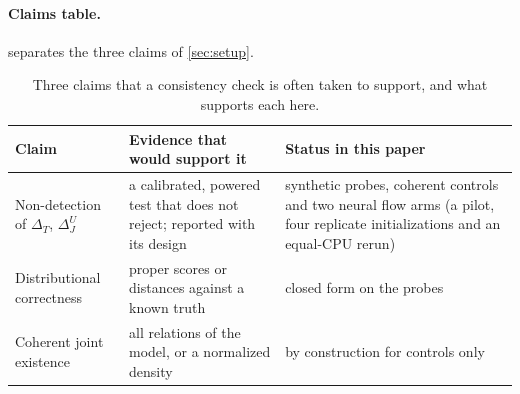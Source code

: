 \documentclass{article}
\theoremstyle{plain}
\theoremstyle{definition}
\theoremstyle{remark}
\begin{document}
\paragraph{Claims table.}
 separates the three claims of \cref{sec:setup}.
\begin{table}[h]
\centering
\caption{Three claims that a consistency check is often taken to support, and what supports each here.}
\label{tab:claims}
\scriptsize
\setlength{\tabcolsep}{3pt}
\begin{tabular}{p{}p{}p{}}
\toprule
Claim & Evidence that would support it & Status in this paper \\
\midrule
Non-detection of $\Delta_T$, $\Delta_J^U$ & a calibrated, powered test that does not reject; reported with its design & synthetic probes, coherent controls and two neural flow arms (a pilot, four replicate initializations and an equal-CPU rerun) \\
Distributional correctness & proper scores or distances against a known truth & closed form on the probes \\
Coherent joint existence & all relations of the model, or a normalized density & by construction for controls only \\
\bottomrule
\end{tabular}
\end{table}
\end{document}
